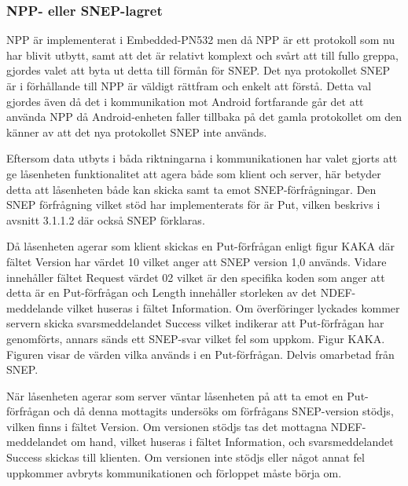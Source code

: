 \documentclass[11pt]{article}
\begin{document}

\subsubsection{NPP- eller SNEP-lagret}
NPP är implementerat i Embedded-PN532 men då NPP är ett protokoll som nu har blivit utbytt, samt att det är relativt komplext och svårt att till fullo greppa, gjordes valet att byta ut detta till förmån för SNEP. Det nya protokollet SNEP är i förhållande till NPP är väldigt rättfram och enkelt att förstå. Detta val gjordes även då det i kommunikation mot Android fortfarande går det att använda NPP då Android-enheten faller tillbaka på det gamla protokollet om den känner av att det nya protokollet SNEP inte används. 

Eftersom data utbyts i båda riktningarna i kommunikationen har valet gjorts att ge låsenheten funktionalitet att agera både som klient och server, här betyder detta att låsenheten både kan skicka samt ta emot SNEP-förfrågningar. Den SNEP förfrågning vilket stöd har implementerats för är Put, vilken beskrivs i avsnitt 3.1.1.2 där också SNEP förklaras. 

Då låsenheten agerar som klient skickas en Put-förfrågan enligt figur KAKA där fältet Version har värdet 10 vilket anger att SNEP version 1,0 används. Vidare innehåller fältet Request värdet 02 vilket är den specifika koden som anger att detta är en Put-förfrågan och Length innehåller storleken av det NDEF-meddelande vilket huseras i fältet Information. Om överföringer lyckades kommer servern skicka svarsmeddelandet Success vilket indikerar att Put-förfrågan har genomförts, annars sänds ett SNEP-svar vilket fel som uppkom.
Figur KAKA. Figuren visar de värden vilka används i en Put-förfrågan. Delvis omarbetad från SNEP.


När låsenheten agerar som server väntar låsenheten på att ta emot en Put-förfrågan och då denna mottagits undersöks om förfrågans SNEP-version stödjs, vilken finns i fältet Version. Om versionen stödjs tas det mottagna NDEF-meddelandet om hand, vilket huseras i fältet Information, och svarsmeddelandet Success skickas till klienten. Om versionen inte stödjs eller något annat fel uppkommer avbryts kommunikationen och förloppet måste börja om.
\end{document}
